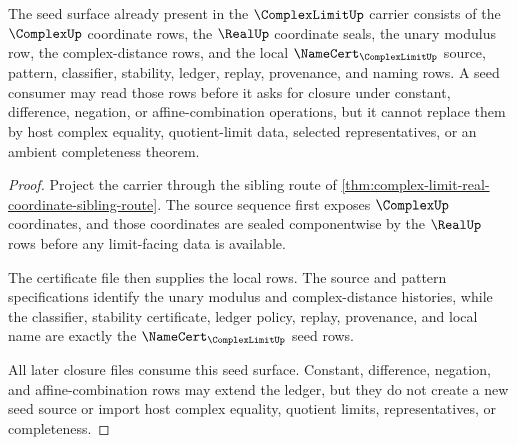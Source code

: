 \begin{theorem}
\label{thm:complex-limit-seed-closure-register}
The seed surface already present in the $\ComplexLimitUp$ carrier consists of the $\ComplexUp$ coordinate rows, the $\RealUp$ coordinate seals, the unary modulus row, the complex-distance rows, and the local $\NameCert_{\ComplexLimitUp}$ source, pattern, classifier, stability, ledger, replay, provenance, and naming rows. A seed consumer may read those rows before it asks for closure under constant, difference, negation, or affine-combination operations, but it cannot replace them by host complex equality, quotient-limit data, selected representatives, or an ambient completeness theorem.
\end{theorem}
\begin{proof}
Project the carrier through the sibling route of \autoref{thm:complex-limit-real-coordinate-sibling-route}. The source sequence first exposes $\ComplexUp$ coordinates, and those coordinates are sealed componentwise by the $\RealUp$ rows before any limit-facing data is available.

The certificate file then supplies the local rows. The source and pattern specifications identify the unary modulus and complex-distance histories, while the classifier, stability certificate, ledger policy, replay, provenance, and local name are exactly the $\NameCert_{\ComplexLimitUp}$ seed rows.

All later closure files consume this seed surface. Constant, difference, negation, and affine-combination rows may extend the ledger, but they do not create a new seed source or import host complex equality, quotient limits, representatives, or completeness.
\end{proof}
